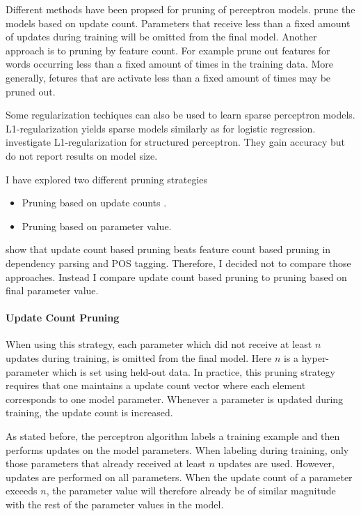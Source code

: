 Different methods have been propsed for pruning of perceptron
models. \cite{Goldberg2011} prune the models based on update
count. Parameters that receive less than a fixed amount of updates
during training will be omitted from the final model. Another approach
is to pruning by feature count. For example \cite{Hulden2013} prune
out features for words occurring less than a fixed amount of times in
the training data. More generally, fetures that are activate less than
a fixed amount of times may be pruned out. 

Some regularization techiques can also be used to learn sparse
perceptron models. L1-regularization yields sparse models similarly as
for logistic regression. \cite{Zhang2014} investigate
L1-regularization for structured perceptron. They gain accuracy but do
not report results on model size.

I have explored two different pruning strategies
\begin{itemize}
\item Pruning based on update counts \citep{Goldberg2011}.
\item Pruning based on parameter value.
\end{itemize}
\cite{Goldberg2011} show that update count based pruning beats feature
count based pruning in dependency parsing and POS tagging. Therefore,
I decided not to compare those approaches. Instead I compare update
count based pruning to pruning based on final parameter value.

\paragraph{Update Count Pruning} When using this strategy, each
parameter which did not receive at least $n$ updates during training,
is omitted from the final model. Here $n$ is a hyper-parameter which
is set using held-out data. In practice, this pruning strategy
requires that one maintains a update count vector where each element
corresponds to one model parameter. Whenever a parameter is updated
during training, the update count is increased.

As stated before, the perceptron algorithm labels a training example
and then performs updates on the model parameters. When labeling
during training, only those parameters that already received at least
$n$ updates are used. However, updates are performed on all
parameters. When the update count of a parameter exceeds $n$, the
parameter value will therefore already be of similar magnitude with
the rest of the parameter values in the model.

